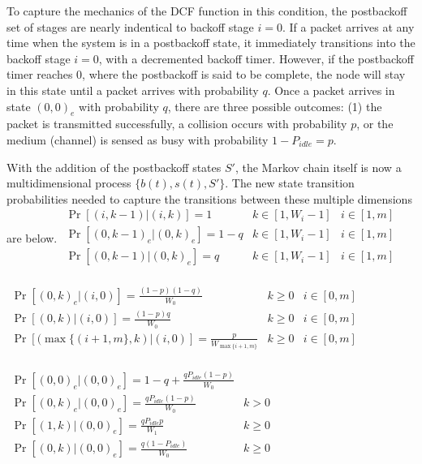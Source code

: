 \documentclass[conference]{IEEEtran}
\begin{document}
To capture the mechanics of the DCF function in this condition, the postbackoff set of stages are nearly indentical to backoff stage $i = 0$. If a packet arrives at any time when the system is in a postbackoff state, it immediately transitions into the backoff stage $i = 0$, with a decremented backoff timer. However, if the postbackoff timer reaches $0$, where the postbackoff is said to be complete, the node will stay in this state until a packet arrives with probability $q$. Once a packet arrives in state $(0, 0)_e$ with probability $q$, there are three possible outcomes: (1) the packet is transmitted successfully, a collision occurs with probability $p$, or the medium (channel) is sensed as busy with probability $1 - P_{idle} = p$. 

With the addition of the postbackoff states $S'$, the Markov chain itself is now a multidimensional process $\{b(t), s(t), S' \}$. The new state transition probabilities needed to capture the transitions between these multiple dimensions are below.
\begin{math}
\boxed{
\begin{array}{lll}
\Pr[(i,k-1) | (i, k)] = 1 & k \in [1, W_i-1] & i \in [1,m] \\
\Pr[(0,k-1)_e | (0, k)_e] = 1-q & k \in [1, W_i-1] & i \in [1,m] \\
\Pr[(0,k-1) | (0, k)_e] = q & k \in [1, W_i-1] & i \in [1,m] \\
\end{array}
}
\end{math}

\begin{math}
\boxed{
\begin{array}{lll}
\Pr[(0,k)_e | (i, 0)] = \frac{(1-p)(1-q)}{W_0} & k \geq 0 & i \in [0,m] \\
\Pr[(0,k) | (i, 0)] = \frac{(1-p)q}{W_0} & k \geq 0 & i \in [0,m] \\
\Pr[(\max\{(i+1,m\}, k) | (i, 0)] = \frac{p}{W_{\max\{i+1,m\}}} & k \geq 0 & i \in [0,m] \\
\end{array}
}
\end{math}

\begin{math}
\boxed{
\begin{array}{ll}
\Pr[(0,0)_e | (0, 0)_e] = 1 - q + \frac{qP_{idle}(1 - p)}{W_0} & ~ \\
\Pr[(0,k)_e | (0, 0)_e] = \frac{qP_{idle}(1 - p)}{W_0} & k > 0 \\
\Pr[(1,k) | (0, 0)_e] = \frac{qP_{idle}p}{W_1} & k \geq 0 \\
\Pr[(0,k) | (0, 0)_e] = \frac{q(1 - P_{idle})}{W_0} & k \geq 0 \\
\end{array}
}
\end{math}
\end{document}
